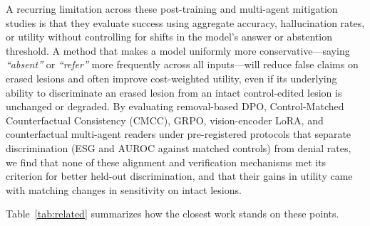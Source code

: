 \documentclass[5p,times,twocolumn,authoryear]{elsarticle}
\begin{document}
A recurring limitation across these post-training and multi-agent mitigation studies is that they evaluate success using aggregate accuracy, hallucination rates, or utility without controlling for shifts in the model's answer or abstention threshold. A method that makes a model uniformly more conservative---saying \emph{``absent''} or \emph{``refer''} more frequently across all inputs---will reduce false claims on erased lesions and often improve cost-weighted utility, even if its underlying ability to discriminate an erased lesion from an intact control-edited lesion is unchanged or degraded. By evaluating removal-based DPO, Control-Matched Counterfactual Consistency (CMCC), GRPO, vision-encoder LoRA, and counterfactual multi-agent readers under pre-registered protocols that separate discrimination (ESG and AUROC against matched controls) from denial rates, we find that none of these alignment and verification mechanisms met its criterion for better held-out discrimination, and that their gains in utility came with matching changes in sensitivity on intact lesions.

Table~\ref{tab:related} summarizes how the closest work stands on these points.
\end{document}
